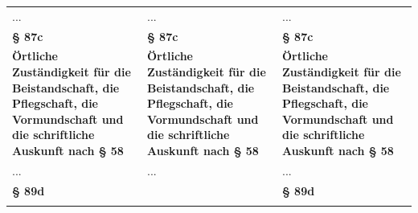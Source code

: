 \documentclass[10pt,a4paper,landscape]{article}
\begin{document}
\begin{longtable}{|L{8.2cm}|L{8.2cm}|L{8.2cm}|}
\hhline{|---|}
... & ... & ... \\
\hhline{|---|}
\textbf{\S{} 87c} & \textbf{\S{} 87c} & \textbf{\S{} 87c} \\
\hhline{|---|}
\textbf{Örtliche Zuständigkeit für die  \newline Beistandschaft, die Pflegschaft, die  \newline Vormundschaft und die schriftliche  \newline Auskunft nach \S{} 58} & \textbf{Örtliche Zuständigkeit für die  \newline Beistandschaft, die Pflegschaft, die  \newline Vormundschaft und die schriftliche  \newline Auskunft nach \S{} 58} & \textbf{Örtliche Zuständigkeit für die  \newline Beistandschaft, die Pflegschaft, die  \newline Vormundschaft und die schriftliche  \newline Auskunft nach \S{} 58} \\
\hhline{|---|}
... & ... & ... \\
\hhline{|---|}
\textbf{\S{} 89d} &  & \textbf{\S{} 89d} \\
\hhline{|---|}

\end{longtable}
\end{document}
